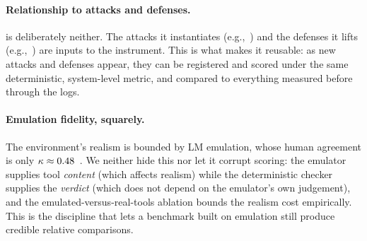\paragraph{Relationship to attacks and defenses.}
 is deliberately neither. The attacks it instantiates
(e.g.,~\cite{lee2024promptinfection,zhou2025corba,gu2024agentsmith,he2025redteaming,chen2024agentpoison})
and the defenses it lifts (e.g.,~\cite{inan2023llamaguard,rebedea2023nemo,hua2024trustagent,zeng2024autodefense,yu2025gsafeguard})
are inputs to the instrument. This is what makes it reusable: as new attacks and defenses
appear, they can be registered and scored under the same deterministic, system-level metric,
and compared to everything measured before through the \corb{} logs.

\paragraph{Emulation fidelity, squarely.}
The environment's realism is bounded by LM emulation, whose human agreement is only
$\kappa\approx0.48$~\cite{ruan2024toolemu}. We neither hide this nor let it corrupt
scoring: the emulator supplies tool \emph{content} (which affects realism) while the
deterministic checker supplies the \emph{verdict} (which does not depend on the emulator's
own judgement), and the emulated-versus-real-tools ablation bounds the realism cost
empirically. This is the discipline that lets a benchmark built on emulation still produce
credible relative comparisons.
